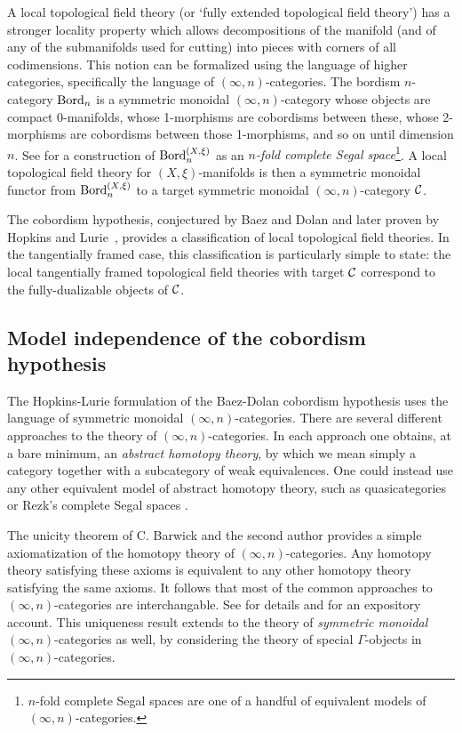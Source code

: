 \documentclass{amsart}
\begin{document}
A local topological field theory (or `fully extended topological field theory') has a stronger locality property which allows decompositions of the manifold (and of any of the submanifolds used for cutting) into pieces with corners of all codimensions. This notion can be formalized using the language of higher categories, specifically the language of $(\infty,n)$-categories. The bordism $n$-category $\mathrm{Bord}_n$ is a symmetric monoidal $(\infty,n)$-category whose objects are compact 0-manifolds, whose 1-morphisms are cobordisms between these, whose 2-morphisms are cobordisms between those 1-morphisms, and so on until dimension $n$. See \cite[\S 2.2]{lurie-ch} for a construction of $\mathrm{Bord}_n^{(X,\xi)}$ as an {\em $n$-fold complete Segal space}\footnote{$n$-fold complete Segal spaces are one of a handful of equivalent models of $(\infty,n)$-categories.}.
 A local topological field theory for $(X,\xi)$-manifolds is then a symmetric monoidal functor from $\mathrm{Bord}_n^{(X,\xi)}$ to a target symmetric monoidal $(\infty,n)$-category $\mathcal C$. 

The cobordism hypothesis, conjectured by Baez and Dolan \cite{MR1355899} and later proven by Hopkins and Lurie~\cite{lurie-ch}, provides a classification of local topological field theories.  In the tangentially framed case, this classification is particularly simple to state: the local tangentially framed topological field theories with target $\mathcal C$ correspond to the fully-dualizable objects of $\mathcal C$.


\subsection{Model independence of the cobordism hypothesis}

The Hopkins-Lurie formulation of the Baez-Dolan cobordism hypothesis uses the language of symmetric monoidal $(\infty,n)$-categories. There are several different approaches to the theory of $(\infty,n)$-categories. In each approach one obtains, at a bare minimum, an {\em abstract homotopy theory}, by which we mean simply a category together with a subcategory of weak equivalences.  One could instead use any other equivalent model of abstract homotopy theory, such as quasicategories \cite{Joyal_quasicats} or Rezk's complete Segal spaces \cite{Rezk_complete_Segal_Spaces}. 


The unicity theorem of C. Barwick and the second author \cite{Barwick-SP} provides a simple axiomatization of the homotopy theory of $(\infty,n)$-categories. Any homotopy theory satisfying these axioms is equivalent to any other homotopy theory satisfying the same axioms. It follows that most of the common approaches to $(\infty, n)$-categories are interchangable. See \cite{Barwick-SP} for details and \cite{SP_DLHC_Lectures} for an expository account. This uniqueness result extends to the theory of {\em symmetric monoidal} $(\infty, n)$-categories as well, by considering the theory of special $\Gamma$-objects in $(\infty,n)$-categories. 
\end{document}
